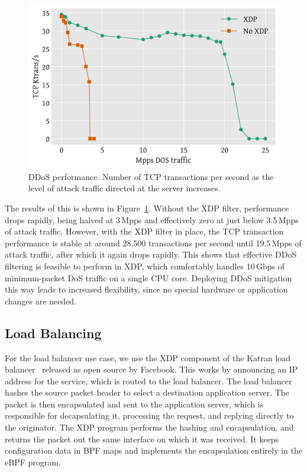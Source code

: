 \documentclass[sigconf]{acmart}
\begin{document}
\begin{figure}[t]
\centering
\includegraphics[width=\linewidth]{figures/ddos-test.pdf}
\caption{\label{fig:ddos-results} DDoS performance. Number of TCP transactions
  per second as the level of attack traffic directed at the server increases.}
\end{figure}

The results of this is shown in Figure~\ref{fig:ddos-results}. Without the XDP
filter, performance drops rapidly, being halved at 3\,Mpps and effectively zero
at just below 3.5\,Mpps of attack traffic. However, with the XDP filter in
place, the TCP transaction performance is stable at around 28.500 transactions
per second until 19.5\,Mpps of attack traffic, after which it again drops
rapidly. This shows that effective DDoS filtering is feasible to perform in XDP,
which comfortably handles 10\,Gbps of minimum-packet DoS traffic on a single CPU
core. Deploying DDoS mitigation this way leads to increased flexibility, since
no special hardware or application changes are needed.

\subsection{Load Balancing}
\label{sec:load-balancer}
For the load balancer use case, we use the XDP component of the Katran load
balancer~\cite{katran} released as open source by Facebook. This works by
announcing an IP address for the service, which is routed to the load balancer.
The load balancer hashes the source packet header to select a destination
application server. The packet is then encapsulated and sent to the application
server, which is responsible for decapsulating it, processing the request, and
replying directly to the originator. The XDP program performs the hashing and
encapsulation, and returns the packet out the same interface on which it was
received. It keeps configuration data in BPF maps and implements the
encapsulation entirely in the eBPF program.
\end{document}
